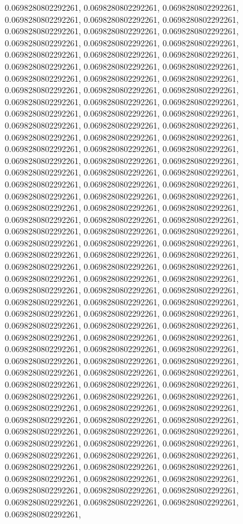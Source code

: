 \documentclass[
  ,man]{apa6}
\begin{document}
0.0698280802292261, 0.0698280802292261, 0.0698280802292261, 0.0698280802292261, 0.0698280802292261, 0.0698280802292261, 0.0698280802292261, 0.0698280802292261, 0.0698280802292261, 0.0698280802292261, 0.0698280802292261, 0.0698280802292261, 0.0698280802292261, 0.0698280802292261, 0.0698280802292261, 0.0698280802292261, 0.0698280802292261, 0.0698280802292261, 0.0698280802292261, 0.0698280802292261, 0.0698280802292261, 0.0698280802292261, 0.0698280802292261, 0.0698280802292261, 0.0698280802292261, 0.0698280802292261,
0.0698280802292261, 0.0698280802292261, 0.0698280802292261, 0.0698280802292261, 0.0698280802292261, 0.0698280802292261, 0.0698280802292261, 0.0698280802292261, 0.0698280802292261, 0.0698280802292261, 0.0698280802292261, 0.0698280802292261, 0.0698280802292261, 0.0698280802292261, 0.0698280802292261, 0.0698280802292261, 0.0698280802292261, 0.0698280802292261, 0.0698280802292261, 0.0698280802292261, 0.0698280802292261, 0.0698280802292261, 0.0698280802292261, 0.0698280802292261, 0.0698280802292261, 0.0698280802292261,
0.0698280802292261, 0.0698280802292261, 0.0698280802292261, 0.0698280802292261, 0.0698280802292261, 0.0698280802292261, 0.0698280802292261, 0.0698280802292261, 0.0698280802292261, 0.0698280802292261, 0.0698280802292261, 0.0698280802292261, 0.0698280802292261, 0.0698280802292261, 0.0698280802292261, 0.0698280802292261, 0.0698280802292261, 0.0698280802292261, 0.0698280802292261, 0.0698280802292261, 0.0698280802292261, 0.0698280802292261, 0.0698280802292261, 0.0698280802292261, 0.0698280802292261, 0.0698280802292261,
0.0698280802292261, 0.0698280802292261, 0.0698280802292261, 0.0698280802292261, 0.0698280802292261, 0.0698280802292261, 0.0698280802292261, 0.0698280802292261, 0.0698280802292261, 0.0698280802292261, 0.0698280802292261, 0.0698280802292261, 0.0698280802292261, 0.0698280802292261, 0.0698280802292261, 0.0698280802292261, 0.0698280802292261, 0.0698280802292261, 0.0698280802292261, 0.0698280802292261, 0.0698280802292261, 0.0698280802292261, 0.0698280802292261, 0.0698280802292261, 0.0698280802292261, 0.0698280802292261,
0.0698280802292261, 0.0698280802292261, 0.0698280802292261, 0.0698280802292261, 0.0698280802292261, 0.0698280802292261, 0.0698280802292261, 0.0698280802292261, 0.0698280802292261, 0.0698280802292261, 0.0698280802292261, 0.0698280802292261, 0.0698280802292261, 0.0698280802292261, 0.0698280802292261, 0.0698280802292261, 0.0698280802292261, 0.0698280802292261, 0.0698280802292261, 0.0698280802292261, 0.0698280802292261, 0.0698280802292261, 0.0698280802292261, 0.0698280802292261, 0.0698280802292261, 0.0698280802292261,
\end{document}
